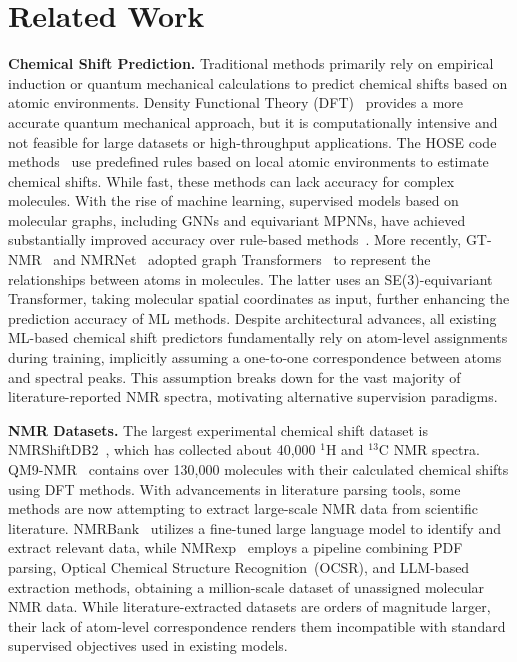 


\section{Related Work}

\textbf{Chemical Shift Prediction.} 
Traditional methods primarily rely on empirical induction or quantum mechanical calculations to predict chemical shifts based on atomic environments. 
Density Functional Theory (DFT)~\cite{wolinski1990giao} provides a more accurate quantum mechanical approach, but it is computationally intensive and not feasible for large datasets or high-throughput applications.  
The HOSE code methods~\cite{bremser1978hose} use predefined rules based on local atomic environments to estimate chemical shifts. While fast, these methods can lack accuracy for complex molecules.  
With the rise of machine learning, supervised models based on molecular graphs, including GNNs and equivariant MPNNs, have achieved substantially improved accuracy over rule-based methods~\cite{jonas2019rapid, kwon2020FCG, han2022SGNN, zou2023DetaNet}.
More recently, GT-NMR~\cite{chen2024gt} and NMRNet~\cite{xu2025toward} adopted graph Transformers~\cite{vaswani2017attention} to represent the relationships between atoms in molecules. The latter uses an SE(3)-equivariant Transformer, taking molecular spatial coordinates as input, further enhancing the prediction accuracy of ML methods.
Despite architectural advances, all existing ML-based chemical shift predictors fundamentally rely on atom-level assignments during training, implicitly assuming a one-to-one correspondence between atoms and spectral peaks. 
This assumption breaks down for the vast majority of literature-reported NMR spectra, motivating alternative supervision paradigms.

\textbf{NMR Datasets.}  
The largest experimental chemical shift dataset is NMRShiftDB2~\cite{kuhn2015NMRShiftDB2}, which has collected about 40,000 \(^1\)H and \(^{13}\)C NMR spectra.  
QM9-NMR~\cite{gupta2021qm9nmr} contains over 130,000 molecules with their calculated chemical shifts using DFT methods.  
With advancements in literature parsing tools, some methods are now attempting to extract large-scale NMR data from scientific literature.  
NMRBank~\cite{wang2025nmrextractor} utilizes a fine-tuned large language model to identify and extract relevant data, while NMRexp~\cite{wang2025nmrexp} employs a pipeline combining PDF parsing, Optical Chemical Structure Recognition~(OCSR), and LLM-based extraction methods, obtaining a million-scale dataset of unassigned molecular NMR data.
While literature-extracted datasets are orders of magnitude larger, their lack of atom-level correspondence renders them incompatible with standard supervised objectives used in existing models.

